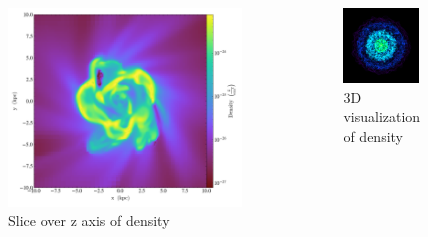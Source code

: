 \documentclass[
  ignorenonframetext,
]{beamer}
\begin{document}
\begin{frame}
\begin{columns}[T]
\begin{column}{0.5\textwidth}
\begin{figure}
\centering
\includegraphics{galaxy0030_Slice_z_density.png}
\caption{Slice over z axis of density}
\end{figure}
\end{column}

\begin{column}{0.5\textwidth}
\begin{figure}
\centering
\includegraphics[width=0.85\textwidth,height=0.85\textheight]{galaxy0030_3dviz.png}
\caption{3D visualization of density}
\end{figure}
\end{column}
\end{columns}
\end{frame}
\end{document}
